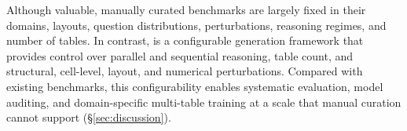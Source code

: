 
Although valuable, manually curated benchmarks are largely fixed in their domains, layouts, question distributions, perturbations, reasoning regimes, and number of tables. In contrast, \name is a configurable generation framework that provides control over parallel and sequential reasoning, table count, and structural, cell-level, layout, and numerical perturbations. Compared with existing benchmarks, this configurability enables systematic evaluation, model auditing, and domain-specific multi-table training at a scale that manual curation cannot support (\S\ref{sec:discussion}). 


